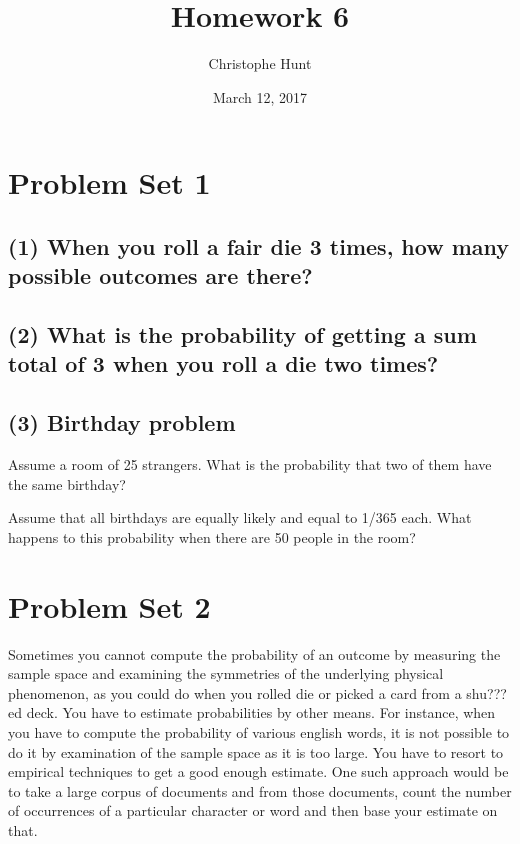 \documentclass[]{article}
\title{Homework 6}
\author{Christophe Hunt}
\date{March 12, 2017}
\begin{document}
\maketitle

{
\setcounter{tocdepth}{2}
\tableofcontents
}
\section{Problem Set 1}\label{problem-set-1}

\subsection{(1) When you roll a fair die 3 times, how many possible
outcomes are
there?}\label{when-you-roll-a-fair-die-3-times-how-many-possible-outcomes-are-there}

\subsection{(2) What is the probability of getting a sum total of 3 when
you roll a die two
times?}\label{what-is-the-probability-of-getting-a-sum-total-of-3-when-you-roll-a-die-two-times}

\subsection{(3) Birthday problem}\label{birthday-problem}

Assume a room of 25 strangers. What is the probability that two of them
have the same birthday?

Assume that all birthdays are equally likely and equal to 1/365 each.
What happens to this probability when there are 50 people in the room?

\section{Problem Set 2}\label{problem-set-2}

Sometimes you cannot compute the probability of an outcome by measuring
the sample space and examining the symmetries of the underlying physical
phenomenon, as you could do when you rolled die or picked a card from a
shu???ed deck. You have to estimate probabilities by other means. For
instance, when you have to compute the probability of various english
words, it is not possible to do it by examination of the sample space as
it is too large. You have to resort to empirical techniques to get a
good enough estimate. One such approach would be to take a large corpus
of documents and from those documents, count the number of occurrences
of a particular character or word and then base your estimate on that.
\end{document}
